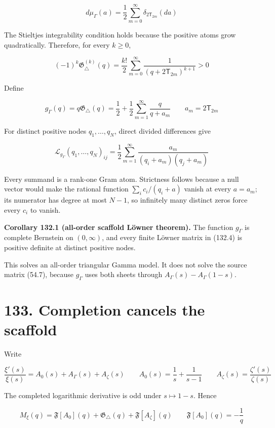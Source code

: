 \documentclass[
  11pt,
]{book}
\renewenvironment{quote}
  {\begin{tcolorbox}[
      enhanced,
      breakable,
      colback=tncream,
      colframe=tnrust,
      boxrule=0.8pt,
      arc=1.5pt,
      left=7pt,
      right=7pt,
      top=6pt,
      bottom=6pt]}
  {\end{tcolorbox}}
\begin{document}
\[
d\mu_\Gamma(a)
=\frac12\sum_{m=0}^{\infty}
\delta_{2\mathsf T_{2m}}(da)
\tag{132.1}
\]

The Stieltjes integrability condition holds because the positive atoms
grow quadratically. Therefore, for every \(k\ge0\),

\[
(-1)^k\mathfrak G_\triangle^{(k)}(q)
=\frac{k!}{2}\sum_{m=0}^{\infty}
\frac1{(q+2\mathsf T_{2m})^{k+1}}>0
\tag{132.2}
\]

Define

\[
g_\Gamma(q)=q\mathfrak G_\triangle(q)
=\frac12+\frac12\sum_{m=1}^{\infty}
\frac{q}{q+a_m}
\qquad
a_m=2\mathsf T_{2m}
\tag{132.3}
\]

For distinct positive nodes \(q_1,\ldots,q_N\), direct divided
differences give

\[
\boxed{
\mathcal L_{g_\Gamma}(q_1,\ldots,q_N)_{ij}
=\frac12\sum_{m=1}^{\infty}
\frac{a_m}{(q_i+a_m)(q_j+a_m)}
}
\tag{132.4}
\]

Every summand is a rank-one Gram atom. Strictness follows because a null
vector would make the rational function \(\sum_i c_i/(q_i+a)\) vanish at
every \(a=a_m\); its numerator has degree at most \(N-1\), so infinitely
many distinct zeros force every \(c_i\) to vanish.

\begin{quote}
\textbf{Corollary 132.1 (all-order scaffold Löwner theorem).} The
function \(g_\Gamma\) is complete Bernstein on \((0,\infty)\), and every
finite Löwner matrix in (132.4) is positive definite at distinct
positive nodes.
\end{quote}

This solves an all-order triangular Gamma model. It does not solve the
source matrix (54.7), because \(g_\Gamma\) uses both sheets through
\(A_\Gamma(s)-A_\Gamma(1-s)\).

\section{133. Completion cancels the
scaffold}\label{completion-cancels-the-scaffold}

Write

\[
\frac{\xi'(s)}{\xi(s)}
=A_0(s)+A_\Gamma(s)+A_\zeta(s)
\qquad
A_0(s)=\frac1s+\frac1{s-1}
\qquad
A_\zeta(s)=\frac{\zeta'(s)}{\zeta(s)}
\tag{133.1}
\]

The completed logarithmic derivative is odd under \(s\mapsto1-s\). Hence

\[
M_\xi(q)
=\mathfrak F[A_0](q)
+\mathfrak G_\triangle(q)
+\mathfrak F[A_\zeta](q)
\qquad
\mathfrak F[A_0](q)=-\frac1q
\tag{133.2}
\]
\end{document}
